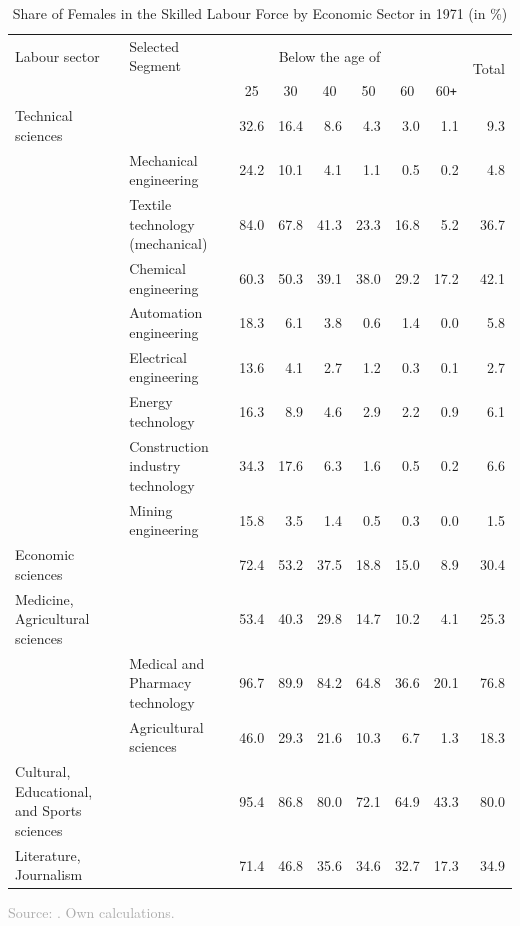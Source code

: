 \documentclass[11pt, aspectratio=1610, xcolor={dvipsnames}]{beamer}
\newcommand*{\myalign}[2]{\multicolumn{1}{#1}{#2}}
\begin{document}
	\begin{frame}
		\frametitle{}
		
		{\linespread{1}\tiny
		\begin{table}[h]
			\centering
			\caption{Share of Females in the Skilled Labour Force by Economic Sector in 1971 (in \%)}
			\label{tab:gdr_yearbook}
			
			\begin{tabular}{llrrrrrrr}
				\toprule
				Labour sector & Selected Segment & \multicolumn{5}{c}{Below the age of} & & \multirow[c]{2}{*}{Total} \\
				& & \myalign{c}{25} & \myalign{c}{30} & \myalign{c}{40} & \myalign{c}{50} & \myalign{c}{60} & \myalign{c}{60\texttt{+}} & \\
				\midrule
				Technical sciences & & 32.6 & 16.4 & 8.6 & 4.3 & 3.0 & 1.1 & 9.3 \\
				& Mechanical engineering & 24.2 & 10.1 & 4.1 & 1.1 & 0.5 & 0.2 & 4.8 \\
				& Textile technology (mechanical) & 84.0 & 67.8 & 41.3 & 23.3 & 16.8 & 5.2 & 36.7 \\
				& Chemical engineering & 60.3 & 50.3 & 39.1 & 38.0 & 29.2 & 17.2 & 42.1 \\
				& Automation engineering & 18.3 & 6.1 & 3.8 & 0.6 & 1.4 & 0.0 & 5.8 \\
				& Electrical engineering & 13.6 & 4.1 & 2.7 & 1.2 & 0.3 & 0.1 & 2.7 \\
				& Energy technology & 16.3 & 8.9 & 4.6 & 2.9 & 2.2 & 0.9 & 6.1 \\
				& Construction industry technology & 34.3 & 17.6 & 6.3 & 1.6 & 0.5 & 0.2 & 6.6 \\
				& Mining engineering &  15.8 & 3.5 & 1.4 & 0.5 & 0.3 & 0.0 & 1.5 \\
				Economic sciences & & 72.4 & 53.2 & 37.5 & 18.8 & 15.0 & 8.9 & 30.4 \\
				Medicine, Agricultural sciences & & 53.4 & 40.3 & 29.8 & 14.7 & 10.2 & 4.1 & 25.3 \\
				& Medical and Pharmacy technology & 96.7 & 89.9 & 84.2 &  64.8 & 36.6 & 20.1 & 76.8 \\
				& Agricultural sciences & 46.0 & 29.3 & 21.6 & 10.3 & 6.7 & 1.3 & 18.3 \\
				Cultural, Educational, and Sports sciences & & 95.4 & 86.8 & 80.0 & 72.1 & 64.9 & 43.3 & 80.0 \\
				Literature, Journalism & & 71.4 & 46.8 & 35.6 & 34.6 & 32.7 & 17.3 & 34.9 \\
				\bottomrule
			\end{tabular}
		\end{table}
		}
		
		{\scriptsize
			\textcolor{darkgray}{Source: \cite[p. 442]{DDRJahrbuch1973}. Own calculations.}
		}
		
		
	\end{frame}
	
\end{document}
